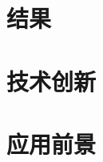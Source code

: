 \documentclass[UTF8, twocolumn ]{ctexart}
\begin{document}
\section{结果}


\section{技术创新}


\section{应用前景}

\end{document}
